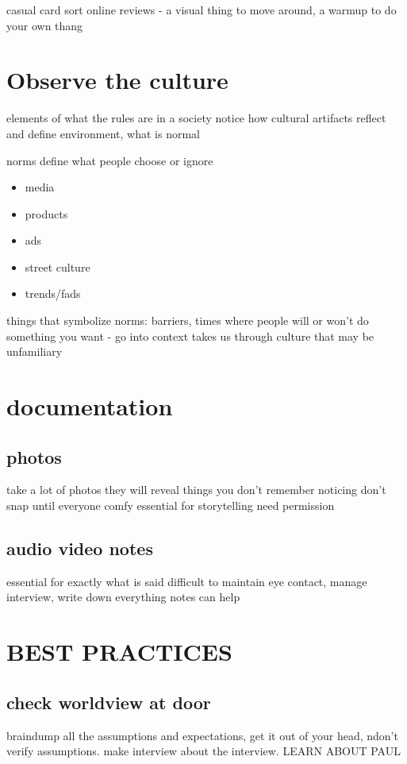 \documentclass{article}
\begin{document}
casual card sort
online reviews - a visual thing to move around, a warmup to do your own thang

\section{Observe the culture}
elements of what the rules are in a society
notice how cultural artifacts reflect and define environment, what is normal

norms define what people choose or ignore
\begin{itemize}
\item{media}
\item{products}
\item{ads}
\item{street culture}
\item{trends/fads}
\end{itemize}

things that symbolize norms: barriers, times where people will or won't do something you want - go into context takes us through culture that may be unfamiliary

\section{documentation}
\subsection{photos}
take a lot of photos
they will reveal things you don't remember noticing
don't snap until everyone comfy
essential for storytelling
need permission

\subsection{audio video notes}
essential for exactly what is said
difficult to maintain eye contact, manage interview, write down everything
notes can help

\section{BEST PRACTICES}

\subsection{check worldview at door}
braindump all the assumptions and expectations, get it out of your head, ndon't verify assumptions. make interview about the interview. LEARN ABOUT PAUL
\end{document}
